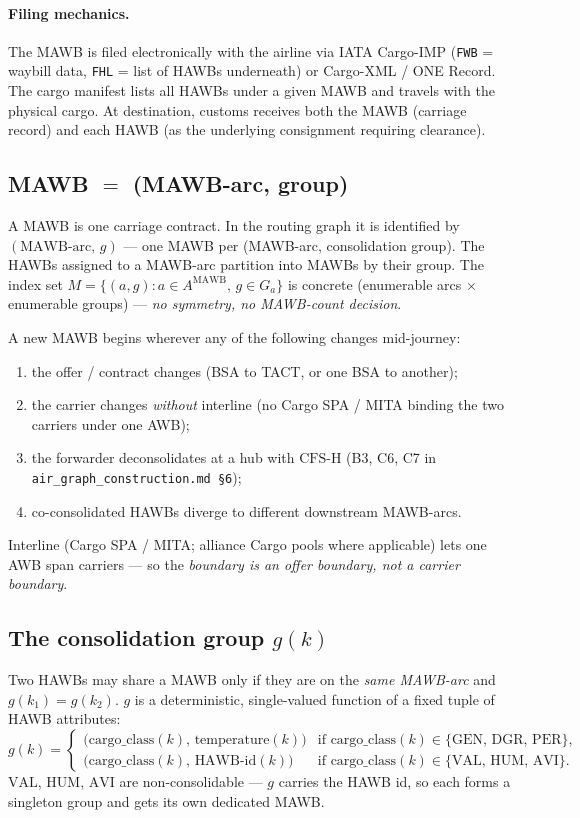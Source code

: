 \documentclass[11pt,a4paper]{article}
\theoremstyle{definition}
\begin{document}
\paragraph{Filing mechanics.}
The MAWB is filed electronically with the airline via IATA Cargo-IMP
(\texttt{FWB} = waybill data, \texttt{FHL} = list of HAWBs underneath) or
Cargo-XML / ONE Record. The cargo manifest lists all HAWBs under a given MAWB
and travels with the physical cargo. At destination, customs receives both the
MAWB (carriage record) and each HAWB (as the underlying consignment requiring
clearance).

\subsection{MAWB \(=\) (MAWB-arc, group)}
\label{sec:mawb-arc-g}

A MAWB is one carriage contract. In the routing graph it is identified by
\textbf{$(\text{MAWB-arc},\, g)$} --- one MAWB per (MAWB-arc, consolidation
group). The HAWBs assigned to a MAWB-arc partition into MAWBs by their group.
The index set $M = \{(a, g) : a \in A^{\text{MAWB}},\, g \in G_a\}$ is concrete
(enumerable arcs $\times$ enumerable groups) --- \emph{no symmetry, no
MAWB-count decision}.

A new MAWB begins wherever any of the following changes mid-journey:
\begin{enumerate}[noitemsep,label=(\alph*)]
  \item the offer / contract changes (BSA to TACT, or one BSA to another);
  \item the carrier changes \emph{without} interline (no Cargo SPA / MITA
        binding the two carriers under one AWB);
  \item the forwarder deconsolidates at a hub with $\text{CFS-H}$ (B3, C6, C7
        in \texttt{air\_graph\_construction.md \S6});
  \item co-consolidated HAWBs diverge to different downstream MAWB-arcs.
\end{enumerate}
Interline (Cargo SPA / MITA; alliance Cargo pools where applicable) lets one
AWB span carriers --- so the \emph{boundary is an offer boundary, not a carrier
boundary}.

\subsection{The consolidation group \(g(k)\)}
\label{sec:g-of-k}

Two HAWBs may share a MAWB only if they are on the \emph{same MAWB-arc} and
$g(k_1) = g(k_2)$. $g$ is a deterministic, single-valued function of a fixed
tuple of HAWB attributes:
\[
  g(k) =
    \begin{cases}
      \bigl(\text{cargo\_class}(k),\,\text{temperature}(k)\bigr)
        & \text{if } \text{cargo\_class}(k) \in \{\text{GEN, DGR, PER}\}, \\
      \bigl(\text{cargo\_class}(k),\,\text{HAWB-id}(k)\bigr)
        & \text{if } \text{cargo\_class}(k) \in \{\text{VAL, HUM, AVI}\}.
    \end{cases}
\]
$\text{VAL}$, $\text{HUM}$, $\text{AVI}$ are non-consolidable --- $g$ carries
the HAWB id, so each forms a singleton group and gets its own dedicated MAWB.
\end{document}
